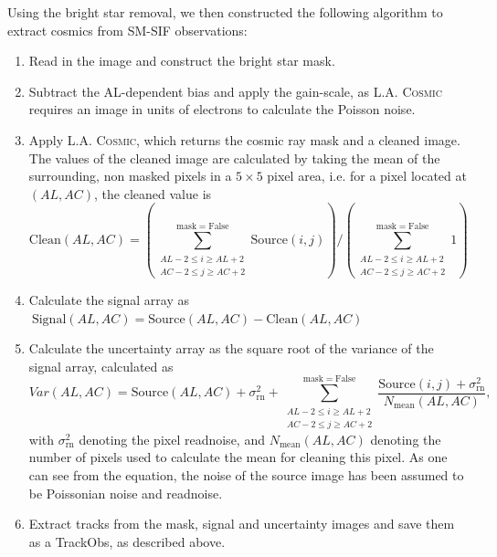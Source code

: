 \documentclass[a4paper, 11pt]{article}
\begin{document}
Using the bright star removal, we then constructed the following algorithm to extract cosmics from SM-SIF observations:
\begin{enumerate}
  \item Read in the image and construct the bright star mask.
  \item Subtract the AL-dependent bias and apply the gain-scale, as \textsc{L.A. Cosmic} requires an image in units of electrons to calculate the Poisson noise.
  \item Apply \textsc{L.A. Cosmic}, which returns the cosmic ray mask and a cleaned image. The values of the cleaned image are calculated by taking the mean of the surrounding, non masked pixels in a $5 \times 5$ pixel area, i.e. for a pixel located at $\left(AL,AC\right)$, the cleaned value is
    \begin{equation*}
      \mathrm{Clean}\left(AL,AC\right) = \left( \sum\limits^\mathrm{mask=False}_{\substack{AL-2 \leq i \geq AL+2 \\ AC-2 \leq j \geq AC+2}} \mathrm{Source}\left( i, j \right) \right) \bigg/ \left( \sum\limits^\mathrm{mask=False}_{\substack{AL-2 \leq i \geq AL+2 \\ AC-2 \leq j \geq AC+2}} 1\right)
    \end{equation*}
  \item Calculate the signal array as $~\mathrm{Signal}\left(AL, AC\right)= \mathrm{Source}\left(AL, AC\right) - \mathrm{Clean}\left(AL, AC\right)$
  \item Calculate the uncertainty array as the square root of the variance of the signal array, calculated as
    \begin{equation*}
      Var\left(AL,AC\right) = \mathrm{Source}\left(AL,AC\right) + \sigma_\mathrm{rn}^2 + \sum\limits^\mathrm{mask=False}_{\substack{AL-2 \leq i \geq AL+2 \\ AC-2 \leq j \geq AC+2}} \frac{\mathrm{Source}\left(i,j\right) + \sigma_\mathrm{rn}^2}{N_\mathrm{mean}\left(AL,AC\right)},
    \end{equation*}
    with $\sigma_\mathrm{rn}^2$ denoting the pixel readnoise, and $N_\mathrm{mean}\left(AL,AC\right)$ denoting the number of pixels used to calculate the mean for cleaning this pixel. As one can see from the equation, the noise of the source image has been assumed to be Poissonian noise and readnoise.
  \item Extract tracks from the mask, signal and uncertainty images and save them as a TrackObs, as described above.
    
\end{enumerate}
\end{document}

